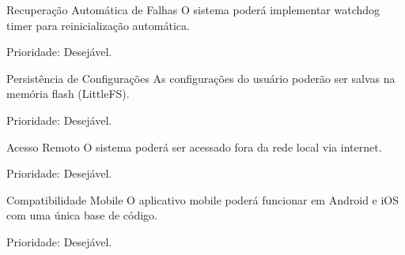 \begin{nfreq}{Recuperação Automática de Falhas}
O sistema poderá implementar watchdog timer para reinicialização automática.

Prioridade:  Desejável.
\end{nfreq}

\begin{nfreq}{Persistência de Configurações}
As configurações do usuário poderão ser salvas na memória flash (LittleFS).

Prioridade:  Desejável.
\end{nfreq}

\begin{nfreq}{Acesso Remoto}
O sistema poderá ser acessado fora da rede local via internet.

Prioridade:  Desejável.
\end{nfreq}

\begin{nfreq}{Compatibilidade Mobile}
O aplicativo mobile poderá funcionar em Android e iOS com uma única base de código.

Prioridade:  Desejável.
\end{nfreq}
